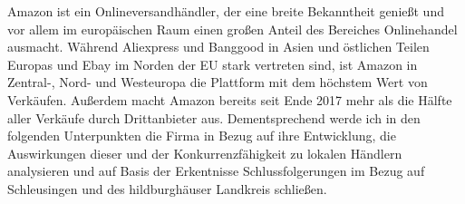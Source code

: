  Amazon ist ein Onlineversandhändler, der eine breite Bekanntheit genießt und vor allem im europäischen Raum einen großen Anteil des Bereiches Onlinehandel ausmacht. Während Aliexpress und Banggood in Asien und östlichen Teilen Europas und Ebay im Norden der EU stark vertreten sind, ist Amazon in Zentral-, Nord- und Westeuropa die Plattform mit dem höchstem Wert von Verkäufen\cite[S. 22]{EuroCommerce}. Außerdem macht Amazon bereits seit Ende 2017 mehr als die Hälfte aller Verkäufe durch Drittanbieter aus\cite[S. 25]{Haendlerbund}. Dementsprechend werde ich in den folgenden Unterpunkten die Firma in Bezug auf ihre Entwicklung, die Auswirkungen dieser und der Konkurrenzfähigkeit zu lokalen Händlern analysieren und auf Basis der Erkentnisse Schlussfolgerungen im Bezug auf Schleusingen und des hildburghäuser Landkreis schließen.
